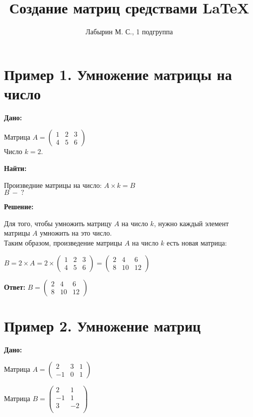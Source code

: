 \documentclass[12pt]{article}
\author{Лабырин М. С., 1 подгруппа}
\title{Создание матриц средствами \LaTeX{}}
\begin{document}
\maketitle

\section*{Пример 1. Умножение матрицы на число}

\textbf{Дано:}

Матрица $
  A = \begin{pmatrix}
    1 & 2 & 3 \\
    4 & 5 & 6
  \end{pmatrix}
$ \\
Число $k = 2$.

\textbf{Найти:}

Произведние матрицы на число: $A \times k = B$ \\
$B~-~?$

\textbf{Решение:}

Для того, чтобы умножить матрицу $A$ на число $k$, нужно каждый элемент матрицы
$A$ умножить на это число.\\
Таким образом, произведение матрицы $A$ на число $k$ есть новая матрица:

$
  B = 2 \times A = 2 \times \begin{pmatrix}
    1 & 2 & 3 \\
    4 & 5 & 6
  \end{pmatrix} = \begin{pmatrix}
    2 & 4 & 6 \\
    8 & 10 & 12
  \end{pmatrix}
$

\textbf{Ответ:} $B = \begin{pmatrix}
  2 & 4 & 6 \\
  8 & 10 & 12
\end{pmatrix}$

\newpage

\section*{Пример 2. Умножение матриц}

\textbf{Дано:}

Матрица $A = \begin{pmatrix}
  2 & 3 & 1 \\
  -1 & 0 & 1
\end{pmatrix}$

Матрица $B = \begin{pmatrix}
  2 & 1 \\
  -1 & 1 \\
  3 & -2 \\
\end{pmatrix}$
\end{document}
